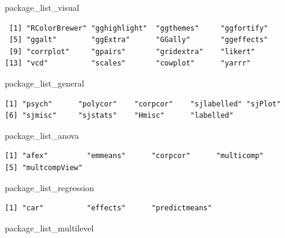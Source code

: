 \documentclass[]{book}
\newenvironment{Shaded}{\begin{snugshade}}{\end{snugshade}}
\newcommand{\NormalTok}[1]{#1}
\theoremstyle{definition}
\theoremstyle{definition}
\theoremstyle{definition}
\theoremstyle{remark}
\begin{document}
\begin{Shaded}
\begin{Highlighting}[]
\NormalTok{package_list_visual}
\end{Highlighting}
\end{Shaded}

\begin{verbatim}
 [1] "RColorBrewer" "gghighlight"  "ggthemes"     "ggfortify"   
 [5] "ggalt"        "ggExtra"      "GGally"       "ggeffects"   
 [9] "corrplot"     "gpairs"       "gridextra"    "likert"      
[13] "vcd"          "scales"       "cowplot"      "yarrr"       
\end{verbatim}

\begin{Shaded}
\begin{Highlighting}[]
\NormalTok{package_list_general}
\end{Highlighting}
\end{Shaded}

\begin{verbatim}
[1] "psych"      "polycor"    "corpcor"    "sjlabelled" "sjPlot"    
[6] "sjmisc"     "sjstats"    "Hmisc"      "labelled"  
\end{verbatim}

\begin{Shaded}
\begin{Highlighting}[]
\NormalTok{package_list_anova}
\end{Highlighting}
\end{Shaded}

\begin{verbatim}
[1] "afex"         "emmeans"      "corpcor"      "multicomp"   
[5] "multcompView"
\end{verbatim}

\begin{Shaded}
\begin{Highlighting}[]
\NormalTok{package_list_regression}
\end{Highlighting}
\end{Shaded}

\begin{verbatim}
[1] "car"          "effects"      "predictmeans"
\end{verbatim}

\begin{Shaded}
\begin{Highlighting}[]
\NormalTok{package_list_multilevel}
\end{Highlighting}
\end{Shaded}
\end{document}
